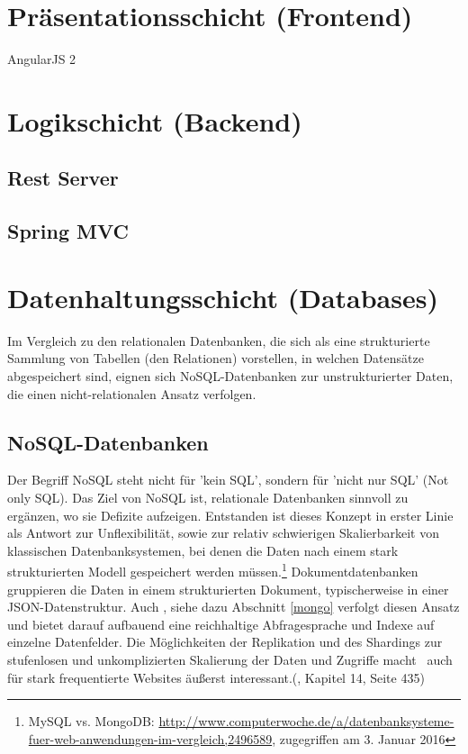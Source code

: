 
\section{Präsentationsschicht (Frontend)}
AngularJS 2

\section{Logikschicht (Backend)}
\subsection{Rest Server}

\subsection{Spring MVC}
\section{Datenhaltungsschicht (Databases)}
Im Vergleich zu den relationalen Datenbanken, die sich als eine strukturierte Sammlung von Tabellen (den Relationen) vorstellen, in welchen Datensätze abgespeichert sind, eignen sich NoSQL-Datenbanken zur unstrukturierter Daten, die einen nicht-relationalen Ansatz verfolgen. 

\subsection{NoSQL-Datenbanken}
Der Begriff NoSQL steht nicht für 'kein SQL', sondern für 'nicht nur SQL' (Not only SQL). Das Ziel von NoSQL ist, relationale Datenbanken sinnvoll zu ergänzen, wo sie Defizite aufzeigen. Entstanden ist dieses Konzept in erster Linie als Antwort zur Unflexibilität, sowie zur relativ schwierigen Skalierbarkeit von klassischen Datenbanksystemen, bei denen die Daten nach einem stark strukturierten Modell gespeichert werden müssen.\footnote{MySQL vs. MongoDB: \url{http://www.computerwoche.de/a/datenbanksysteme-fuer-web-anwendungen-im-vergleich,2496589}, zugegriffen am 3. Januar 2016} Dokumentdatenbanken gruppieren die Daten in einem strukturierten Dokument, typischerweise in einer JSON-Datenstruktur. Auch \mongo, siehe dazu Abschnitt \ref{mongo} verfolgt diesen Ansatz und bietet darauf aufbauend eine reichhaltige Abfragesprache und Indexe auf einzelne Datenfelder. Die Möglichkeiten der Replikation und des Shardings zur stufenlosen und unkomplizierten Skalierung der Daten und Zugriffe macht \mongo\ auch für stark frequentierte Websites äußerst interessant.(\cite{Hollosi.2012}, Kapitel 14, Seite 435)

